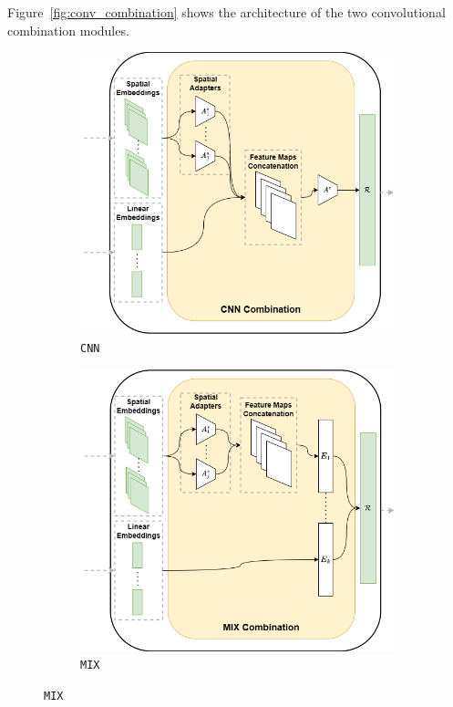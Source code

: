 Figure~\ref{fig:conv_combination} shows the architecture of the two convolutional combination modules.

\begin{figure}[ht]
    \centering
    \begin{subfigure}[b]{0.49\textwidth}
        \centering
        \includegraphics[width=\textwidth]{images/cnn}
        \caption{\texttt{CNN}}
        \label{fig:cnn}
    \end{subfigure}
    \hfill
    \begin{subfigure}[b]{0.49\textwidth}
        \centering
        \includegraphics[width=\textwidth]{images/mix}
        \caption{\texttt{MIX}}
        \label{fig:mix}
    \end{subfigure}


\end{figure}
